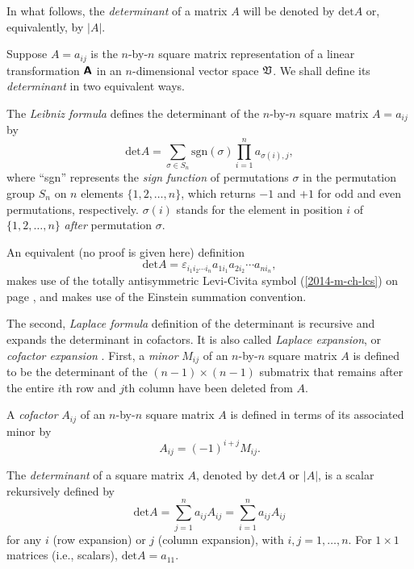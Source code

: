 In what follows, the {\em determinant} of a matrix $A$ will be denoted by $\textrm{det} A$ or,
equivalently, by $\vert A \vert$.

Suppose $A=a_{ij}$ is the  $n$-by-$n$ square matrix representation of
a linear transformation $\textsf{\textbf{A}}$
in an $n$-dimensional vector space ${\frak V}$.
We shall define its {\em determinant}
in two equivalent ways.


The
{\em Leibniz formula}
 defines the determinant of the $n$-by-$n$ square matrix  $A=a_{ij}$ by
\begin{equation}
\textrm{det}A
=\sum_{\sigma \in S_n} \textrm{sgn}(\sigma) \prod_{i=1}^n a_{\sigma(i),j} ,
\end{equation}
where ``sgn'' represents the {\em sign function}
of permutations $\sigma$ in the permutation group $S_n$
on $n$ elements $\{1,2, \ldots , n\}$,
which returns $-1$ and $+1$ for odd and even permutations,
respectively.
$\sigma (i)$ stands for the element in position $i$ of $\{1,2, \ldots , n\}$ {\em after} permutation $\sigma$.

An equivalent (no proof is given here) definition
\begin{equation}
\textrm{det}A
=\varepsilon_{i_1 i_2\cdots i_n} a_{1i_1}a_{2i_2} \cdots a_{ni_n},
\end{equation}
makes use of the  totally antisymmetric Levi-Civita symbol  (\ref{2014-m-ch-lcs}) on page \pageref{2014-m-ch-lcs},
 and makes use of the
 Einstein summation convention.


The second,
{\em Laplace formula}
definition of the determinant
is recursive and expands the determinant in cofactors.
It is also called
{\em Laplace expansion},
or
{\em cofactor expansion}
.
First,
a {\em minor}
$M_{ij}$ of an  $n$-by-$n$ square matrix  $A$ is
defined to be the determinant of the
$(n-1)\times (n-1)$ submatrix
that remains after the entire $i$th row and $j$th column have been deleted from $A$.

A {\em cofactor}
$A_{ij}$
of an $n$-by-$n$ square matrix  $A$
is defined in terms of its associated minor by
\begin{equation}
A_{ij}=(-1)^{i+j}M_{ij}.
\end{equation}

The {\em determinant} of a square matrix $A$, denoted by
$\textrm{det} A$ or $\vert A\vert$, is a scalar rekursively defined by
\begin{equation}
\textrm{det}A
=\sum_{j=1}^n a_{ij}A_{ij}
=\sum_{i=1}^n a_{ij}A_{ij}
\end{equation}
for any $i$ (row expansion) or $j$ (column expansion), with $i,j=1,\ldots ,n$.
For $1\times 1$ matrices (i.e., scalars), $\textrm{det}A =a_{11}$.

